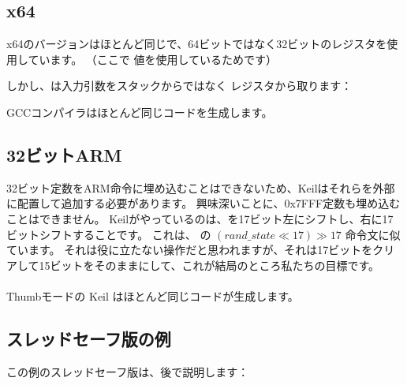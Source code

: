 \subsection{x64}

x64のバージョンはほとんど同じで、64ビットではなく32ビットのレジスタを使用しています。
（ここで \Tint 値を使用しているためです）

しかし、は入力引数をスタックからではなく \ECX レジスタから取ります：



GCCコンパイラはほとんど同じコードを生成します。

\subsection{32ビットARM}



32ビット定数をARM命令に埋め込むことはできないため、Keilはそれらを外部に配置して追加する必要があります。 
興味深いことに、0x7FFF定数も埋め込むことはできません。
Keilがやっているのは、を17ビット左にシフトし、右に17ビットシフトすることです。 
これは、 \CCpp の $(rand\_state \ll 17) \gg 17$ 命令文に似ています。
それは役に立たない操作だと思われますが、それは17ビットをクリアして15ビットをそのままにして、これが結局のところ私たちの目標です。\\
\\
Thumbモードの \Optimizing Keil はほとんど同じコードが生成します。



\subsection{スレッドセーフ版の例}

この例のスレッドセーフ版は、後で説明します：
